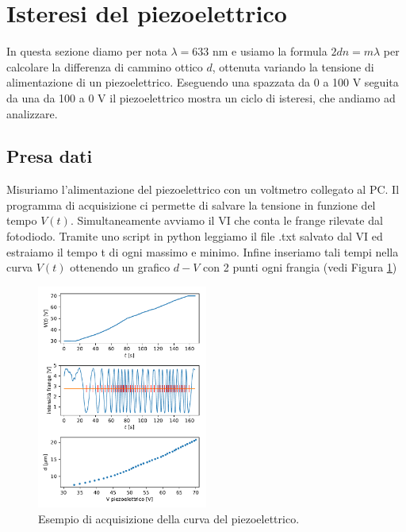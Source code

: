 \documentclass[a4paper]{article}
\begin{document}
\section{Isteresi del piezoelettrico}

In questa sezione diamo per nota $\lambda = 633$ nm e usiamo la formula $2dn = m\lambda$ per calcolare la differenza di cammino ottico $d$, ottenuta variando la tensione di alimentazione di un piezoelettrico. Eseguendo una spazzata da 0 a 100 V seguita da una da 100 a 0 V il piezoelettrico mostra un ciclo di isteresi, che andiamo ad analizzare.

\subsection{Presa dati}
Misuriamo l'alimentazione del piezoelettrico con un voltmetro collegato al PC. Il programma di acquisizione ci permette di salvare la tensione in funzione del tempo $V(t)$.
Simultaneamente avviamo il VI che conta le frange rilevate dal fotodiodo. Tramite uno script in python leggiamo il file .txt salvato dal VI ed estraiamo il tempo t di ogni massimo e minimo. Infine inseriamo tali tempi nella curva $V(t)$ ottenendo un grafico $d-V$ con 2 punti ogni frangia (vedi Figura \ref{fig:esempio_acquisizione_isteresi})

\begin{figure}[H]
	\includegraphics[width=0.5\textwidth]{esempio_acquisizione_isteresi.pdf}
	\caption{Esempio di acquisizione della curva del piezoelettrico.}
	\label{fig:esempio_acquisizione_isteresi}
\end{figure}
\end{document}
